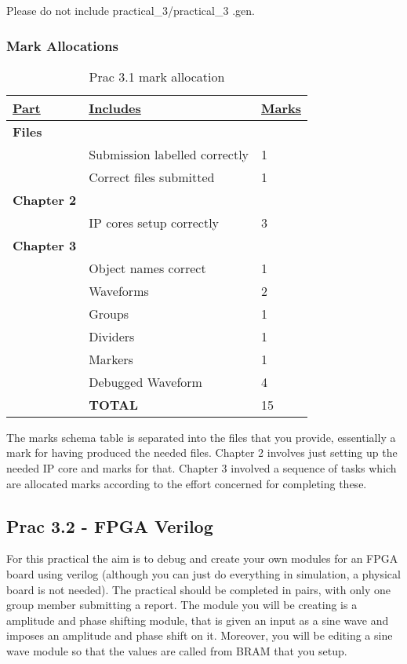 Please do not include practical\_3/practical\_3 .gen.

\subsubsection{Mark Allocations}
\begin{table}[H]
\centering
\caption{Prac 3.1 mark allocation}
\label{tbl:Prac3-Marks}
\begin{tabular}{|l|l|l|}
\hline
{\ul \textbf{Part}} & {\ul \textbf{Includes}} & {\ul \textbf{Marks}} \\ \hline
\textbf{Files} &  &  \\ \hline
 & Submission labelled correctly &  1\\ \hline
 & Correct files submitted &  1\\ \hline
\textbf{Chapter 2} &  &  \\ \hline
 & IP cores setup correctly & 3 \\  \hline
\textbf{Chapter 3} &  &  \\ \hline
 & Object names correct & 1 \\ \hline
 & Waveforms & 2 \\ \hline
 & Groups & 1 \\ \hline
 & Dividers & 1 \\ \hline
 & Markers & 1 \\ \hline
 & Debugged Waveform & 4 \\ \hline
 & \textbf{TOTAL} & 15 \\ \hline
\end{tabular}%
\end{table}

The marks schema table is separated into the files that you provide, essentially a mark for having produced the needed files. Chapter 2 involves just setting up the needed IP core and marks for that. Chapter 3 involved a sequence of tasks which are allocated marks according to the effort concerned for completing these.

\newpage

\subsection{Prac 3.2 - FPGA Verilog}
For this practical the aim is to debug and create your own modules for an FPGA board using verilog (although you can just do everything in simulation, a physical board is not needed). The practical should be completed in pairs, with only one group member submitting a report. The module you will be creating is a amplitude and phase shifting module, that is given an input as a sine wave and imposes an amplitude and phase shift on it. Moreover, you will be editing a sine wave module so that the values are called from BRAM that you setup.


